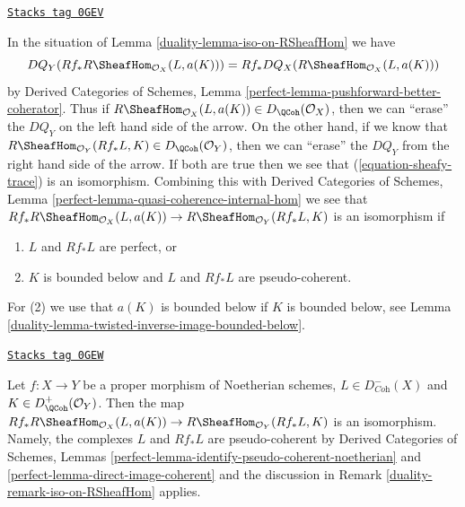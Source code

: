 \begin{remark}
\label{duality-remark-iso-on-RSheafHom}
\href{https://stacks.math.columbia.edu/tag/0GEV}{\texttt{Stacks tag 0GEV}}

In the situation of Lemma \ref{duality-lemma-iso-on-RSheafHom} we have
$$
DQ_Y(Rf_*R\SheafHom_{\mathcal{O}_X}(L, a(K))) =
Rf_* DQ_X(R\SheafHom_{\mathcal{O}_X}(L, a(K)))
$$
by Derived Categories of Schemes, Lemma
\ref{perfect-lemma-pushforward-better-coherator}.
Thus if $R\SheafHom_{\mathcal{O}_X}(L, a(K)) \in D_\QCoh(\mathcal{O}_X)$,
then we can ``erase'' the $DQ_Y$ on the left hand side of the arrow.
On the other hand, if we know that
$R\SheafHom_{\mathcal{O}_Y}(Rf_*L, K) \in D_\QCoh(\mathcal{O}_Y)$,
then we can ``erase'' the $DQ_Y$ from the right hand side of the arrow.
If both are true then we see that (\ref{equation-sheafy-trace})
is an isomorphism. Combining this with
Derived Categories of Schemes, Lemma
\ref{perfect-lemma-quasi-coherence-internal-hom}
we see that $Rf_*R\SheafHom_{\mathcal{O}_X}(L, a(K)) \to
R\SheafHom_{\mathcal{O}_Y}(Rf_*L, K)$ is an isomorphism if
\begin{enumerate}
\item $L$ and $Rf_*L$ are perfect, or
\item $K$ is bounded below and $L$ and $Rf_*L$ are pseudo-coherent.
\end{enumerate}
For (2) we use that $a(K)$ is bounded below if $K$
is bounded below, see Lemma \ref{duality-lemma-twisted-inverse-image-bounded-below}.
\end{remark}

\begin{example}
\label{duality-example-iso-on-RSheafHom-noetherian}
\href{https://stacks.math.columbia.edu/tag/0GEW}{\texttt{Stacks tag 0GEW}}

Let $f : X \to Y$ be a proper morphism of Noetherian schemes,
$L \in D^-_{\textit{Coh}}(X)$ and $K \in D^+_{\QCoh}(\mathcal{O}_Y)$.
Then the map $Rf_*R\SheafHom_{\mathcal{O}_X}(L, a(K)) \to
R\SheafHom_{\mathcal{O}_Y}(Rf_*L, K)$ is an isomorphism.
Namely, the complexes $L$ and $Rf_*L$ are pseudo-coherent by
Derived Categories of Schemes, Lemmas
\ref{perfect-lemma-identify-pseudo-coherent-noetherian} and
\ref{perfect-lemma-direct-image-coherent}
and the discussion in Remark \ref{duality-remark-iso-on-RSheafHom} applies.
\end{example}

